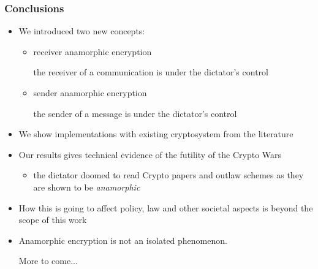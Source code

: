 \documentclass[handout]{beamer}
\begin{document}
\begin{frame}
\frametitle{Conclusions}
\begin{itemize}
\item We introduced two new concepts:
    \begin{itemize}
        \item {\color{purple} receiver anamorphic encryption} 

         the {\color{red} receiver} of a communication is under 
        the dictator's control

        \item {\color{purple} sender anamorphic encryption} 

         the {\color{red} sender} of a message is under 
        the dictator's control

    \end{itemize}
\item We show implementations with {\color{red} existing} cryptosystem
    from the literature
\item Our results gives technical evidence of the futility of the
{\color{purple} Crypto Wars}
    \begin{itemize}
        \item the dictator doomed to read Crypto papers and outlaw schemes
                as they are shown to be {\color{purple} \em anamorphic}
    \end{itemize}
\item How this is going to affect policy, law and other societal aspects
    is beyond the scope of this work
    
\item {\color{purple} Anamorphic encryption} is not an isolated phenomenon. 

{\color{purple} More to come...}
\end{itemize}
\end{frame}
\end{document}

